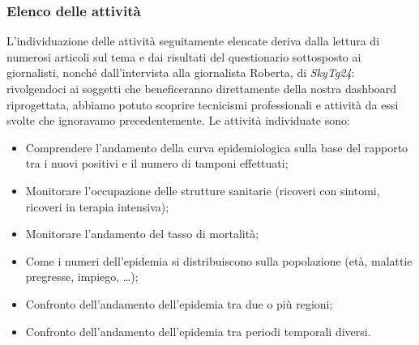 \subsubsection{Elenco delle attività}
L'individuazione delle attività seguitamente elencate deriva dalla lettura di numerosi articoli sul tema e dai risultati del questionario sottosposto ai giornalisti, nonché dall'intervista alla giornalista Roberta, di \textit{SkyTg24}: rivolgendoci ai soggetti che beneficeranno direttamente della nostra dashboard riprogettata, abbiamo potuto scoprire tecnicismi professionali e attività da essi svolte che ignoravamo precedentemente.
\noindent
Le attività individuate sono:
\begin{itemize}
    \item Comprendere l'andamento della curva epidemiologica sulla base del rapporto tra i nuovi positivi e il numero di tamponi effettuati;
    \item Monitorare l'occupazione delle strutture sanitarie (ricoveri con sintomi, ricoveri in terapia intensiva);
    \item Monitorare l'andamento del tasso di mortalità;
    \item Come i numeri dell'epidemia si distribuiscono sulla popolazione (età, malattie pregresse, impiego, …);
    \item Confronto dell'andamento dell'epidemia tra due o più regioni;
    \item Confronto dell'andamento dell'epidemia tra periodi temporali diversi.
\end{itemize}

